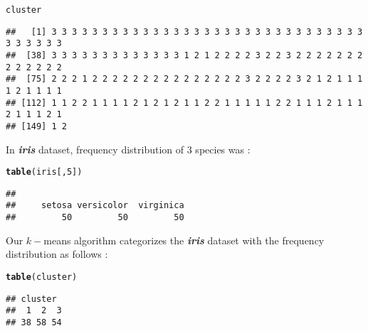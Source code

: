 \documentclass[11pt, a4paper]{article}\usepackage[]{graphicx}\usepackage[]{xcolor}
\makeatletter
\newcommand{\hlnum}[1]{\textcolor[rgb]{0.686,0.059,0.569}{#1}}%
\newcommand{\hldef}[1]{\textcolor[rgb]{0.345,0.345,0.345}{#1}}%
\newcommand{\hlkwd}[1]{\textcolor[rgb]{0.737,0.353,0.396}{\textbf{#1}}}%
\newenvironment{kframe}{%
 \def\at@end@of@kframe{}%
 \ifinner\ifhmode%
  \def\at@end@of@kframe{\end{minipage}}%
  \begin{minipage}{\columnwidth}%
 \fi\fi%
 \def\FrameCommand##1{\hskip\@totalleftmargin \hskip-\fboxsep
 \colorbox{shadecolor}{##1}\hskip-\fboxsep
     \hskip-\linewidth \hskip-\@totalleftmargin \hskip\columnwidth}%
 \MakeFramed {\advance\hsize-\width
   \@totalleftmargin\z@ \linewidth\hsize
   \@setminipage}}%
 {\par\unskip\endMakeFramed%
 \at@end@of@kframe}
\newenvironment{knitrout}{}{} %
\makeatother
\begin{document}
\begin{knitrout}
\color{fgcolor}\begin{kframe}
\begin{alltt}
\hldef{cluster}
\end{alltt}
\begin{verbatim}
##   [1] 3 3 3 3 3 3 3 3 3 3 3 3 3 3 3 3 3 3 3 3 3 3 3 3 3 3 3 3 3 3 3 3 3 3 3 3 3
##  [38] 3 3 3 3 3 3 3 3 3 3 3 3 3 1 2 1 2 2 2 2 3 2 2 3 2 2 2 2 2 2 2 2 2 2 2 2 2
##  [75] 2 2 2 1 2 2 2 2 2 2 2 2 2 2 2 2 2 2 2 3 2 2 2 2 3 2 1 2 1 1 1 1 2 1 1 1 1
## [112] 1 1 2 2 1 1 1 1 2 1 2 1 2 1 1 2 2 1 1 1 1 1 2 2 1 1 1 2 1 1 1 2 1 1 1 2 1
## [149] 1 2
\end{verbatim}
\end{kframe}
\end{knitrout}

In \textbf{\textit{iris}} dataset, frequency distribution of 3 species was :

\begin{knitrout}
\color{fgcolor}\begin{kframe}
\begin{alltt}
\hlkwd{table}\hldef{(iris[,}\hlnum{5}\hldef{])}
\end{alltt}
\begin{verbatim}
## 
##     setosa versicolor  virginica 
##         50         50         50
\end{verbatim}
\end{kframe}
\end{knitrout}

Our $k-$means algorithm categorizes the \textbf{\textit{iris}} dataset with the frequency distribution as follows :

\begin{knitrout}
\color{fgcolor}\begin{kframe}
\begin{alltt}
\hlkwd{table}\hldef{(cluster)}
\end{alltt}
\begin{verbatim}
## cluster
##  1  2  3 
## 38 58 54
\end{verbatim}
\end{kframe}
\end{knitrout}
\end{document}
